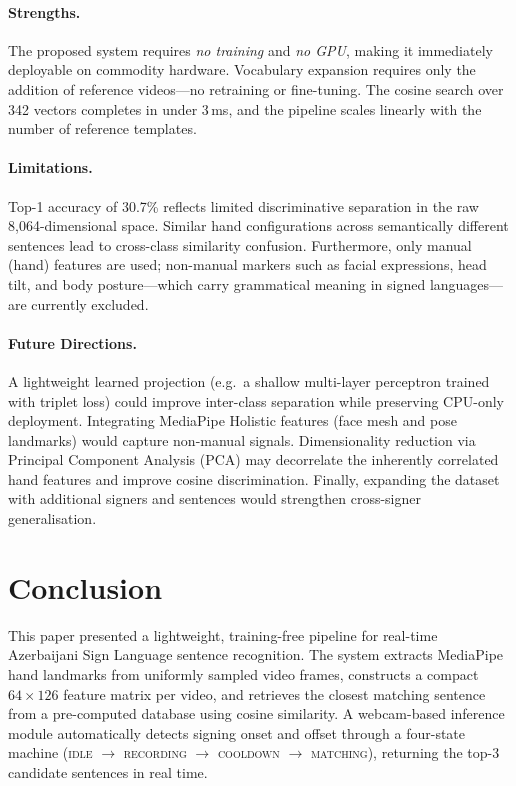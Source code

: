 \documentclass[runningheads]{llncs}
\begin{document}
\paragraph{Strengths.}
The proposed system requires \emph{no training} and \emph{no GPU},
making it immediately deployable on commodity hardware.
Vocabulary expansion requires only the addition of reference videos—no
retraining or fine-tuning.
The cosine search over 342 vectors completes in under 3\,ms, and the
pipeline scales linearly with the number of reference templates.

\paragraph{Limitations.}
Top-1 accuracy of 30.7\% reflects limited discriminative separation in
the raw 8{,}064-dimensional space.
Similar hand configurations across semantically different sentences lead
to cross-class similarity confusion.
Furthermore, only manual (hand) features are used; non-manual markers
such as facial expressions, head tilt, and body posture—which carry
grammatical meaning in signed languages—are currently excluded.

\paragraph{Future Directions.}
A lightweight learned projection (e.g.\ a shallow multi-layer perceptron
trained with triplet loss) could improve inter-class separation while
preserving CPU-only deployment.
Integrating MediaPipe Holistic features (face mesh and pose landmarks)
would capture non-manual signals.
Dimensionality reduction via Principal Component Analysis (PCA) may
decorrelate the inherently correlated hand features and improve cosine
discrimination.
Finally, expanding the dataset with additional signers and sentences
would strengthen cross-signer generalisation.

\section{Conclusion}\label{sec:conclusion}

This paper presented a lightweight, training-free pipeline for real-time
Azerbaijani Sign Language sentence recognition.
The system extracts MediaPipe hand landmarks from uniformly sampled
video frames, constructs a compact $64 \times 126$ feature matrix per
video, and retrieves the closest matching sentence from a pre-computed
database using cosine similarity.
A webcam-based inference module automatically detects signing onset and
offset through a four-state machine
(\textsc{idle} $\rightarrow$ \textsc{recording} $\rightarrow$
\textsc{cooldown} $\rightarrow$ \textsc{matching}),
returning the top-3 candidate sentences in real time.
\end{document}
